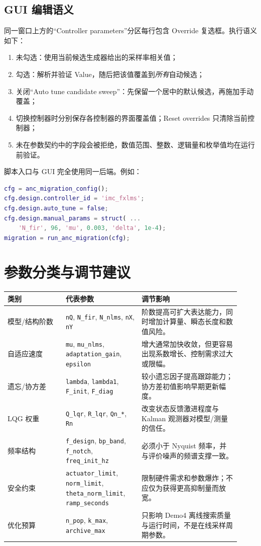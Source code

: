 \documentclass[UTF8,11pt,a4paper]{ctexart}
\begin{document}
\subsection{GUI 编辑语义}

同一窗口上方的“Controller parameters”分区每行包含 Override 复选框。执行语义如下：
\begin{enumerate}
  \item 未勾选：使用当前候选生成器给出的采样率相关值；
  \item 勾选：解析并验证 Value，随后把该值覆盖到\emph{所有}自动候选；
  \item 关闭“Auto tune candidate sweep”：先保留一个居中的默认候选，再施加手动覆盖；
  \item 切换控制器时分别保存各控制器的界面覆盖值；Reset overrides 只清除当前控制器；
  \item 未在参数契约中的字段会被拒绝，数值范围、整数、逻辑量和枚举值均在运行前验证。
\end{enumerate}

脚本入口与 GUI 完全使用同一后端。例如：
\begin{lstlisting}[language=Matlab]
cfg = anc_migration_config();
cfg.design.controller_id = 'imc_fxlms';
cfg.design.auto_tune = false;
cfg.design.manual_params = struct( ...
    'N_fir', 96, 'mu', 0.003, 'delta', 1e-4);
migration = run_anc_migration(cfg);
\end{lstlisting}

\section{参数分类与调节建议}

\begin{longtable}{p{0.23\linewidth}p{0.30\linewidth}p{0.39\linewidth}}
\toprule
类别 & 代表参数 & 调节影响\\
\midrule
\endhead
模型/结构阶数 & \texttt{nQ}, \texttt{N\_fir}, \texttt{N\_nlms},
\texttt{nX}, \texttt{nY} & 阶数提高可扩大表达能力，同时增加计算量、瞬态长度和数值风险。\\
自适应速度 & \texttt{mu}, \texttt{mu\_nlms}, \texttt{adaptation\_gain},
\texttt{epsilon} & 增大通常加快收敛，但更容易出现系数增长、控制需求过大或限幅。\\
遗忘/协方差 & \texttt{lambda}, \texttt{lambda1}, \texttt{F\_init},
\texttt{F\_diag} & 较小遗忘因子提高跟踪能力；协方差初值影响早期更新幅度。\\
LQG 权重 & \texttt{Q\_lqr}, \texttt{R\_lqr}, \texttt{Qn\_*},
\texttt{Rn} & 改变状态反馈激进程度与 Kalman 观测器对模型/测量的信任。\\
频率结构 & \texttt{f\_design}, \texttt{bp\_band}, \texttt{f\_notch},
\texttt{freq\_init\_hz} & 必须小于 Nyquist 频率，并与评价噪声的频谱支撑一致。\\
安全约束 & \texttt{actuator\_limit}, \texttt{norm\_limit},
\texttt{theta\_norm\_limit}, \texttt{ramp\_seconds} & 限制硬件需求和参数爆炸；不应仅为获得更高抑制量而放宽。\\
优化预算 & \texttt{n\_pop}, \texttt{k\_max}, \texttt{archive\_max} & 只影响 Demo4 离线搜索质量与运行时间，不是在线采样周期参数。\\
\bottomrule
\end{longtable}
\end{document}
